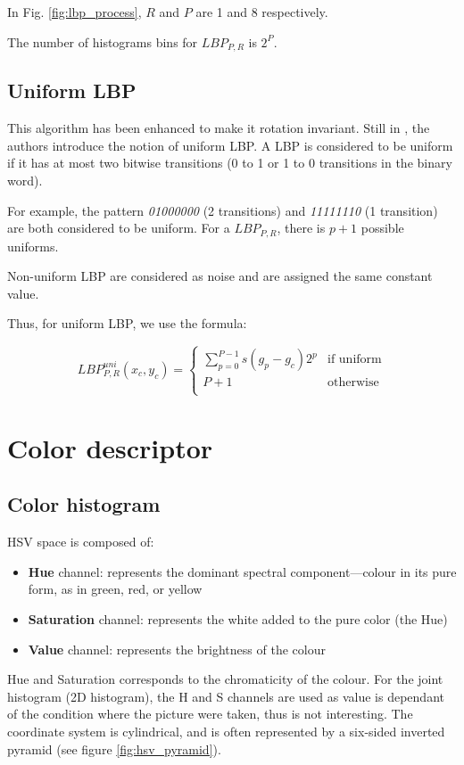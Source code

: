 In Fig. \ref{fig:lbp_process}, $R$ and $P$ are 1 and 8 respectively.

The number of histograms bins for $LBP_{P, R}$ is $2^P$.

\subsection{Uniform LBP}

This algorithm has been enhanced to make it rotation invariant. Still in \cite{Ojala2002}, the authors introduce the notion of uniform LBP. A LBP is considered to be uniform if it has at most two bitwise transitions (0 to 1 or 1 to 0 transitions in the binary word). 

For example, the pattern \textit{01000000}  (2 transitions) and \textit{11111110} (1 transition) are both considered to be uniform. For a $LBP_{P, R}$, there is $p + 1$ possible uniforms.

Non-uniform LBP are considered as noise and are assigned the same constant value.

Thus, for uniform LBP, we use the formula:

$$
LBP_{P, R}^{uni} (x_c, y_c) = 
\begin{cases} \displaystyle
\sum_{p = 0}^{P - 1} s (g_p - g_c) 2^p & \text{if uniform} \\
P + 1 & \text{otherwise} \\
\end{cases}
$$

\section{Color descriptor}
\subsection{Color histogram}

HSV space is composed of:
\begin{itemize}
    \item \textbf{Hue} channel: represents the dominant spectral component—colour in its pure form, as in green, red, or yellow
    \item \textbf{Saturation} channel: represents the white added to the pure color (the Hue)
    \item \textbf{Value} channel: represents the brightness of the colour
\end{itemize}

Hue and Saturation corresponds to the chromaticity of the colour. For the joint histogram (2D histogram), the H and S channels are used as value is dependant of the condition where the picture were taken, thus is not interesting. The coordinate system is cylindrical, and is often represented by a six-sided inverted pyramid (see figure \ref{fig:hsv_pyramid}).

